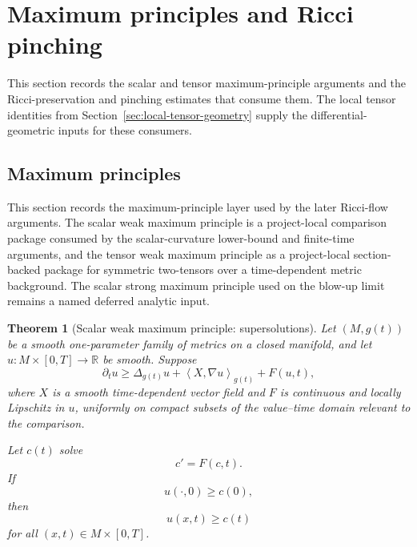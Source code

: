 \documentclass[11pt]{article}
\theoremstyle{plain}
\newtheorem{theorem}{Theorem}[section]
\theoremstyle{definition}
\theoremstyle{remark}
\newcommand{\ip}[2]{\left\langle #1,#2\right\rangle}
\begin{document}
\section{Maximum principles and Ricci pinching}
\label{sec:analytic-consumers}

This section records the scalar and tensor maximum-principle arguments and the
Ricci-preservation and pinching estimates that consume them.
The local tensor identities from Section~\ref{sec:local-tensor-geometry} supply
the differential-geometric inputs for these consumers.



\subsection{Maximum principles}

This section records the maximum-principle layer used by the later Ricci-flow
arguments.  The scalar weak maximum principle is a project-local comparison
package consumed by the scalar-curvature
lower-bound and finite-time arguments, and the tensor weak maximum principle as
a project-local section-backed package for symmetric two-tensors over a
time-dependent metric background.  The scalar strong maximum principle used
on the blow-up limit remains a named deferred analytic input.

\begin{theorem}[Scalar weak maximum principle: supersolutions]
\label{thm:scalar-wmp-super}
Let $(M,g(t))$ be a smooth one-parameter family of metrics on a closed
manifold, and let $u:M\times[0,T]\to\mathbb R$ be smooth. Suppose
\[
\partial_tu
\ge
\Delta_{g(t)}u+
\ip{X}{\nabla u}_{g(t)}+F(u,t),
\]
where $X$ is a smooth time-dependent vector field and $F$ is continuous and
locally Lipschitz in $u$, uniformly on compact subsets of the value--time
domain relevant to the comparison.

Let $c(t)$ solve
\[
c'=F(c,t).
\]
If
\[
u(\cdot,0)\ge c(0),
\]
then
\[
u(x,t)\ge c(t)
\]
for all $(x,t)\in M\times[0,T]$.
\end{theorem}
\end{document}
